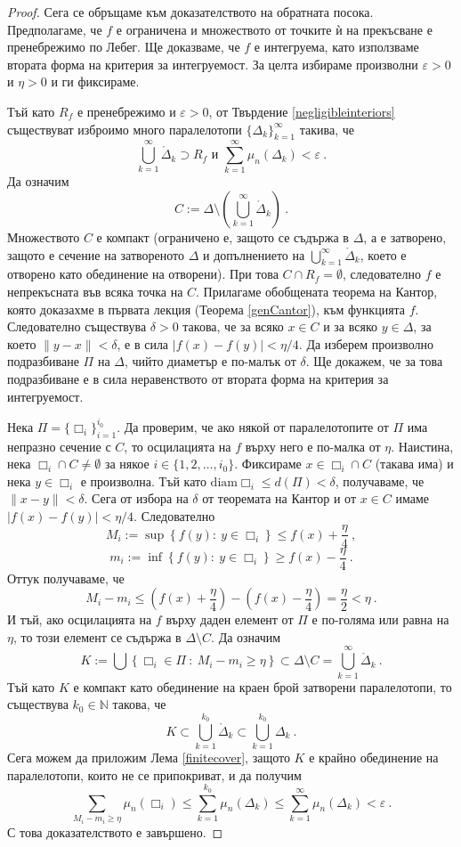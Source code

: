 \documentclass[11pt]{article}
\numberwithin{equation}{section}
\numberwithin{figure}{section}
\numberwithin{table}{section}
\theoremstyle{plain}
\theoremstyle{definition}
\theoremstyle{remark}
\theoremstyle{definition}
\theoremstyle{remark}
\theoremstyle{plain}
\theoremstyle{definition}
\theoremstyle{definition}
\theoremstyle{plain}
\theoremstyle{plain}
\theoremstyle{plain}
\theoremstyle{definition}
\theoremstyle{plain}
\newcommand*{\N}{\mathbb{N}}
\begin{document}
\begin{proof}
Сега се обръщаме към доказателството на обратната посока. Предполагаме, че $f$ е ограничена и множеството от точките \`{и} на прекъсване  е пренебрежимо по Лебег. Ще доказваме, че $f$ е интегруема, като използваме втората форма на критерия за интегруемост. За целта избираме произволни $\varepsilon>0$ и $\eta>0$ и ги фиксираме.

Тъй като $R_f$ е пренебрежимо и $\varepsilon>0$, от Твърдение \ref{negligibleinteriors} съществуват изброимо много паралелотопи $\{\Delta_k \}_{k=1}^\infty$ такива, че $$\bigcup_{k=1}^\infty \mathring\Delta_k \supset R_f  \mbox{ и } \sum_{k=1}^\infty \mu_n(\Delta_k)<\varepsilon \ .$$
Да означим
$$C := \Delta\setminus \left(\bigcup_{k=1}^\infty \mathring\Delta_k\right) \ .$$
Множеството $C$ е компакт (ограничено е, защото се съдържа в $\Delta$, а е затворено, защото е сечение на затвореното $\Delta$ и допълнението на $\bigcup_{k=1}^\infty \mathring\Delta_k$, което е отворено като обединение на отворени). При това $C\cap R_f=\emptyset$, следователно $f$ е непрекъсната във всяка точка на $C$. Прилагаме обобщената теорема на Кантор, която доказахме в първата лекция (Теорема \ref{genCantor}), към функцията $f$. Следователно съществува $\delta >0$ такова, че за всяко $x\in C$ и за всяко $y\in \Delta$, за което $\| y-x\|<\delta$, е в сила $|f(x)-f(y)|<\eta/4$. Да изберем произволно подразбиване $\Pi$ на $\Delta$, чийто диаметър е по-малък от $\delta$. Ще докажем, че за това подразбиване е в сила неравенството от втората форма на критерия за интегруемост.

Нека $\Pi=\{ \Box_i\}_{i=1}^{i_0}$. Да проверим, че ако някой от паралелотопите от $\Pi$ има непразно сечение с $C$, то осцилацията на $f$ върху него е по-малка от $\eta$. Наистина, нека $\Box_i \cap C\not =\emptyset$ за някое $i\in \{ 1,2,\dots ,i_0\}$. Фиксираме $x\in \Box_i \cap C$ (такава има) и нека $y\in \Box_i$ е произволна. Тъй като $\textrm{diam} \Box_i \le d(\Pi)<\delta$, получаваме, че $\| x-y\| <\delta$. Сега от избора на $\delta$ от теоремата на Кантор и от $x\in C$ имаме $|f(x)-f(y)|<\eta/4$. Следователно
$$M_i:=\sup \left\{ f(y): \ y\in \Box_i\right\} \le f(x)+\frac{\eta}{4} \ ,$$
$$m_i:=\inf \left\{ f(y): \ y\in \Box_i\right\} \ge f(x)-\frac{\eta}{4} \ .$$
Оттук получаваме, че
$$M_i-m_i \le \left( f(x)+\frac{\eta}{4}\right)-\left( f(x)-\frac{\eta}{4}\right)=\frac{\eta}{2}<\eta \ .$$
И тъй, ако осцилацията на $f$ върху даден елемент от $\Pi$ е по-голяма или равна на $\eta$, то този елемент се съдържа в $\Delta\setminus C$. Да означим
$$K:= \bigcup\left\{ \Box_i \in \Pi \ : \ M_i-m_i \ge \eta\right\} \subset \Delta\setminus C = \bigcup_{k=1}^\infty \mathring\Delta_k \ .$$
Тъй като $K$ е компакт като обединение на краен брой затворени паралелотопи, то съществува $k_0\in \N$ такова, че
$$K\subset \bigcup_{k=1}^{k_0} \mathring\Delta_k \subset\bigcup_{k=1}^{k_0} \Delta_k \ .$$
Сега можем да приложим Лема \ref{finitecover}, защото $K$ е крайно обединение на паралелотопи, които не се припокриват, и да получим
$$\sum_{M_i-m_i \ge \eta} \mu_n(\Box_i) \le \sum_{k=1}^{k_0} \mu_n(\Delta_k) \le \sum_{k=1}^\infty \mu_n(\Delta_k) < \varepsilon \ .$$
С това доказателството е завършено.
\end{proof}
\end{document}
